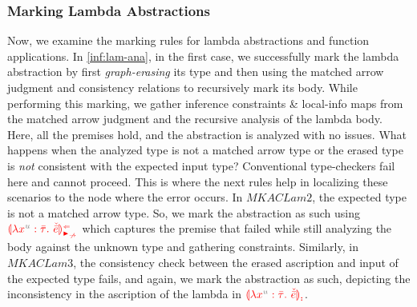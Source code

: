 \subsubsection{Marking Lambda Abstractions}
\label{sub:mark-lam}
Now, we examine the marking rules for lambda abstractions and function applications. In \autoref{inf:lam-ana}, in the first case, we successfully mark the lambda abstraction by first \emph{graph-erasing} its type and then using the matched arrow judgment and consistency relations to recursively mark its body. While performing this marking, we gather inference constraints \& local-info maps from the matched arrow judgment and the recursive analysis of the lambda body. Here, all the premises hold, and the abstraction is analyzed with no issues. What happens when the analyzed type is not a matched arrow type or the erased type is \emph{not} consistent with the expected input type? Conventional type-checkers fail here and cannot proceed. This is where the next rules help in localizing these scenarios to the node where the error occurs. In $MKACLam2$, the expected type is not a matched arrow type. So, we mark the abstraction as such using $\ECLamAnaNonMatchedArrow{\var{x}}{\TLMV}{\ELMV}$ which captures the premise that failed while still analyzing the body against the unknown type and gathering constraints. Similarly, in $MKACLam3$, the consistency check between the erased ascription and input of the expected type fails, and again, we mark the abstraction as such, depicting the inconsistency in the ascription of the lambda in $\ECLamInconAsc{\var{x}}{\TLMV}{\ELMV}$.

